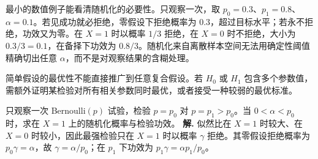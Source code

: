 最小的数值例子能看清随机化的必要性。只观察一次，取
\(p_0=0.3\)、\(p_1=0.8\)、\(\alpha=0.1\)。若见成功就必拒绝，零假设下拒绝概率为 \(0.3\)，超过目标水平；若永不拒绝，功效又为零。在 \(X=1\) 时以概率 \(1/3\) 拒绝，在 \(X=0\) 时不拒绝，大小为
\(0.3/3=0.1\)，在备择下功效为 \(0.8/3\)。随机化来自离散样本空间无法用确定性阈值精确切出任意 \(\alpha\)，而不是对观察结果的含糊处理。

简单假设的最优性不能直接推广到任意复合假设。若 \(H_0\) 或 \(H_1\) 包含多个参数值，需额外证明某检验对所有相关参数同时最优，或者接受一种较弱的最优标准。



\par
\begin{workedexample}
只观察一次 Bernoulli\((p)\) 试验，检验 \(p=p_0\) 对 \(p=p_1>p_0\)。当 \(0<\alpha<p_0\) 时，求在 \(X=1\) 上的随机化概率与检验功效。
\textbf{解.} 似然比在 \(X=1\) 时较大、在 \(X=0\) 时较小，因此最强检验只在 \(X=1\) 时以概率 \(\gamma\) 拒绝。其零假设拒绝概率为 \(p_0\gamma=\alpha\)，故 \(\gamma=\alpha/p_0\)；在 \(p_1\) 下功效为 \(p_1\gamma=\alpha p_1/p_0\)。
\end{workedexample}
\par
